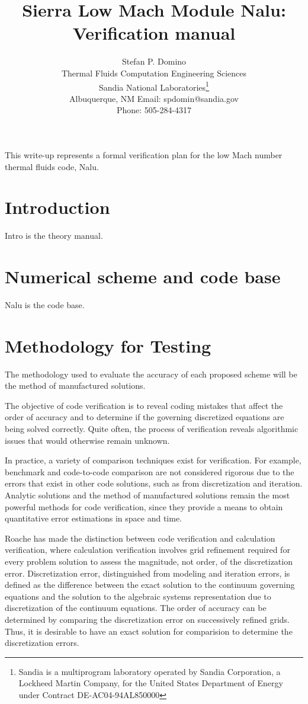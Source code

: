 \documentclass[12pt,final]{article}
\title{Sierra Low Mach Module Nalu: Verification manual}
\author{Stefan P. Domino\\
	Thermal Fluids Computation Engineering Sciences \\		
	Sandia National Laboratories\footnote {Sandia is a multiprogram laboratory operated by Sandia Corporation, a
        Lockheed Martin Company, for the United States Department of Energy
        under Contract DE-AC04-94AL850000}\\	
	Albuquerque, NM
        Email:  spdomin@sandia.gov\\
        Phone:  505-284-4317}
\begin{document}
\maketitle
This write-up represents a formal verification plan for the low Mach
number thermal fluids code, Nalu. 

\section{Introduction}
\label{s:intro}
Intro is the theory manual.

\section{Numerical scheme and code base}
\label{s:cvfem}
Nalu is the code base.

\section{Methodology for Testing}
\label{s:method}
The methodology used to evaluate the accuracy of each proposed
scheme will be the method of manufactured solutions.

The objective of code verification is to reveal coding mistakes that affect the order 
of accuracy and to determine if the governing discretized equations are being solved correctly.
Quite often, the process of verification reveals algorithmic issues that would otherwise remain 
unknown.

In practice, a variety of comparison techniques exist for verification. For example, 
benchmark and code-to-code comparison are not considered rigorous due to the errors
that exist in other code solutions, such as from discretization and iteration. Analytic 
solutions and the method of manufactured solutions remain the most powerful methods for 
code verification, since they provide a means to obtain quantitative error estimations in 
space and time.

Roache has made the distinction between 
code verification and calculation 
verification, where calculation verification involves grid refinement required for every 
problem solution to assess the magnitude, not order, of the discretization error. Discretization
error, distinguished from modeling and iteration errors, is defined as the difference between
the exact solution to the continuum governing equations and the solution to the algebraic 
systems representation due to discretization of the continuum equations. The order of accuracy
can be determined by comparing the discretization error on successively refined grids. Thus, it
is desirable to have an exact solution for comparision to determine the discretization errors.
\end{document}
